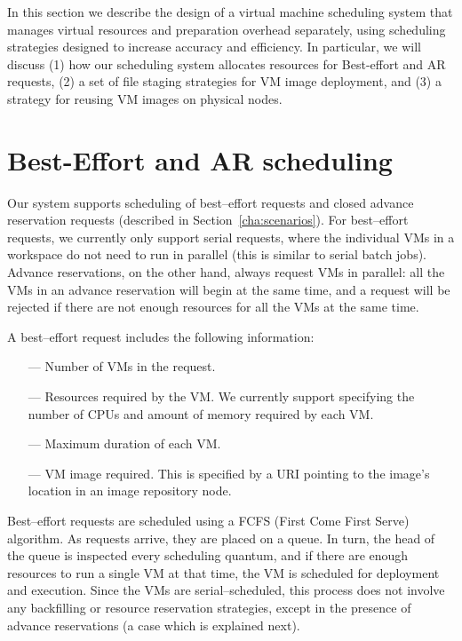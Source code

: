 In this section we describe the design of a virtual machine scheduling system that manages virtual resources and preparation overhead separately, using scheduling strategies designed to increase accuracy and efficiency. In particular, we will discuss (1) how our scheduling system allocates resources for Best-effort and AR requests, (2) a set of file staging strategies for VM image deployment, and (3) a strategy for reusing VM images on physical nodes.

\section{Best-Effort and AR scheduling}
\label{sec:scheduling}

Our system supports scheduling of best--effort requests and closed advance reservation requests (described in Section~\ref{cha:scenarios}). For best--effort requests, we currently only support serial requests, where the individual VMs in a workspace do not need to run in parallel (this is similar to serial batch jobs). Advance reservations, on the other hand, always request VMs in parallel: all the VMs in an advance reservation will begin at the same time, and a request will be rejected if there are not enough resources for all the VMs at the same time.

A best--effort request includes the following information:

\begin{itemize}
\item[---] Number of VMs in the request.
\item[---] Resources required by the VM. We currently support specifying the number of CPUs and amount of memory required by each VM.
\item[---] Maximum duration of each VM.
\item[---] VM image required. This is specified by a URI pointing to the image's location in an image repository node.
\end{itemize}

Best--effort requests are scheduled using a FCFS (First Come First Serve) algorithm. As requests arrive, they are placed on a queue. In turn, the head of the queue is inspected every scheduling quantum, and if there are enough resources to run a single VM at that time, the VM is scheduled for deployment and execution. Since the VMs are serial--scheduled, this process does not involve any backfilling or resource reservation strategies, except in the presence of advance reservations (a case which is explained next).

